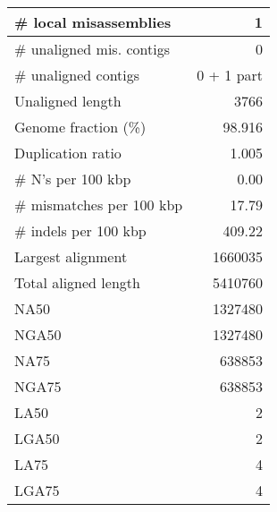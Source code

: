 \documentclass[12pt,a4paper]{article}
\begin{document}
\begin{table}[ht]
\begin{center}
\begin{tabular}{|l*{1}{|r}|}
\# local misassemblies & 1 \\ \hline
\# unaligned mis. contigs & 0 \\ \hline
\# unaligned contigs & 0 + 1 part \\ \hline
Unaligned length & 3766 \\ \hline
Genome fraction (\%) & 98.916 \\ \hline
Duplication ratio & 1.005 \\ \hline
\# N's per 100 kbp & 0.00 \\ \hline
\# mismatches per 100 kbp & 17.79 \\ \hline
\# indels per 100 kbp & 409.22 \\ \hline
Largest alignment & 1660035 \\ \hline
Total aligned length & 5410760 \\ \hline
NA50 & 1327480 \\ \hline
NGA50 & 1327480 \\ \hline
NA75 & 638853 \\ \hline
NGA75 & 638853 \\ \hline
LA50 & 2 \\ \hline
LGA50 & 2 \\ \hline
LA75 & 4 \\ \hline
LGA75 & 4 \\ \hline
\end{tabular}
\end{center}
\end{table}
\end{document}
